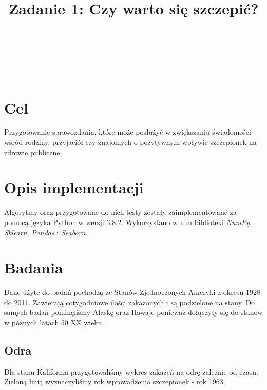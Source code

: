 \documentclass{classrep}
\author{%
\\
  \studentinfo[234053@edu.p.lodz.pl]{Paweł Galewicz}{234053}\\
  \studentinfo[234067@edu.p.lodz.pl]{Bartosz Jurczewski}{234067}\\
  \studentinfo[234102@edu.p.lodz.pl]{Zbigniew Nowacki}{234102}\\
  \studentinfo[234128@edu.p.lodz.pl]{Piotr Wardęcki}{234128}
}
\title{Zadanie 1: Czy warto się szczepić?}
\begin{document}
\maketitle
\thispagestyle{fancyplain}
\clearpage

\section{Cel}
    Przygotowanie sprawozdania, które może posłużyć w zwiększaniu świadomości wśród rodziny, przyjaciół czy znajomych o pozytywnym wpływie szczepionek na zdrowie publiczne.


\section{Opis implementacji}
    Algorytmy oraz przygotowane do nich testy zostały zaimplementowane za pomocą języka Python w wersji 3.8.2.
    Wykorzystano w nim biblioteki \textit{NumPy}, \textit{Sklearn}, \textit{Pandas} i \textit{Seaborn}.

\section{Badania}
    Dane użyte do badań pochodzą ze Stanów Zjednoczonych Ameryki z okresu 1928 do 2011. Zawierają cotygodniowe ilości zakażonych i są podzielone na stany. Do samych badań pominęliśmy Alaskę oraz Hawaje ponieważ dołączyły się do stanów w późnych latach 50 XX wieku.

\subsection{Odra}
    Dla stanu Kalifornia przygotowaliśmy wykres zakażeń na odrę zależnie od czasu. Zieloną linią wyznaczyliśmy rok wprowadzenia szczepionek - rok 1963.
\end{document}
